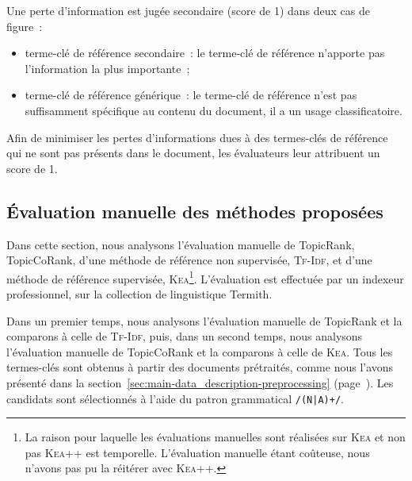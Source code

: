         Une perte d'information est jugée secondaire (score de 1) dans deux
        cas de figure~:
        \begin{itemize}
          \item{terme-clé de référence secondaire~: le terme-clé de référence
                n'apporte pas l'information la plus importante~;}
          \item{terme-clé de référence générique~: le terme-clé de référence
                n'est pas suffisamment spécifique au contenu du document, il a
                un usage classificatoire.}
        \end{itemize}
        Afin de minimiser les pertes d'informations dues à des termes-clés de
        référence qui ne sont pas présents dans le document, les évaluateurs
        leur attribuent un score de 1.

    \subsection{Évaluation manuelle des méthodes proposées}
    \label{subsec:main-domain_specific_keyphrase_annotation-manual_evaluation-analysis}
      Dans cette section, nous analysons l'évaluation manuelle de TopicRank,
      TopicCoRank, d'une méthode de référence non supervisée, \textsc{Tf-Idf},
      et d'une méthode de référence supervisée, \textsc{Kea}\footnote{La raison
      pour laquelle les évaluations
      manuelles sont réalisées sur \textsc{Kea} et non pas \textsc{Kea++} est
      temporelle. L'évaluation manuelle étant coûteuse, nous n'avons pas pu
      la réitérer avec \textsc{Kea++}.}. L'évaluation est
      effectuée par un indexeur professionnel, sur la collection de linguistique
      Termith.

      Dans un premier temps, nous analysons l'évaluation manuelle de TopicRank
      et la comparons à celle de \textsc{Tf-Idf}, puis, dans un second temps,
      nous analysons l'évaluation manuelle de TopicCoRank et la comparons à
      celle de \textsc{Kea}. Tous les termes-clés sont obtenus à partir des
      documents prétraités, comme nous l'avons présenté dans la
      section~\ref{sec:main-data_description-preprocessing}
      (page~\pageref{sec:main-data_description-preprocessing}). Les candidats
      sont sélectionnés à l'aide du patron grammatical \texttt{/(N|A)+/}.

